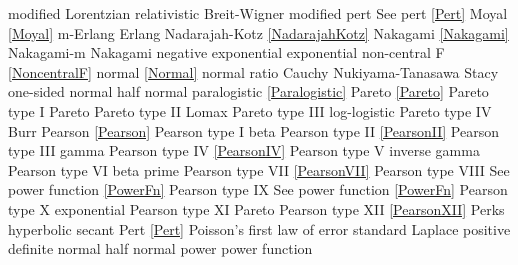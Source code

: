 modified Lorentzian				\dotfill	relativistic Breit-Wigner					%
modified pert					\dotfill	See pert \eqref{Pert}					\ncite	%
Moyal						\dotfill	\eqref{Moyal}						\ncite	
m-Erlang						\dotfill	Erlang 							\ncite	%
%
Nadarajah-Kotz					\dotfill	\eqref{NadarajahKotz}				\mcite{\self}	%
Nakagami 					\dotfill	\eqref{Nakagami} 					\ncite	%
Nakagami-m 					\dotfill	Nakagami 						\ncite   	%
negative exponential				\dotfill	exponential 						\ncite	%
non-central F					\dotfill		\eqref{NoncentralF}				\ncite	%
normal 						\dotfill	\eqref{Normal}						\ncite	%
normal ratio  					\dotfill	Cauchy 							\ncite	%
Nukiyama-Tanasawa 			\dotfill	Stacy 							   	%
%
one-sided normal  				\dotfill	half normal						\ncite	%
paralogistic					\dotfill	\eqref{Paralogistic} 					\ncite	%
Pareto						\dotfill	\eqref{Pareto}						\ncite	%
Pareto type I					\dotfill	Pareto							\ncite	%
Pareto type II					\dotfill	Lomax 							\ncite	%
Pareto type III					\dotfill	log-logistic						\ncite	%
Pareto type IV					\dotfill	Burr								\ncite	%
Pearson			 			\dotfill	\eqref{Pearson}						\ncite	%
Pearson type I					\dotfill	beta 								\ncite	%
Pearson type II					\dotfill	\eqref{PearsonII}					\ncite	%
Pearson type III   				\dotfill	gamma 							\ncite	%
Pearson type IV   				\dotfill	\eqref{PearsonIV} 					\ncite	%
Pearson type V    				\dotfill	inverse gamma						\ncite	%
Pearson type VI				\dotfill	beta prime 						\ncite	%
Pearson type VII				\dotfill	\eqref{PearsonVII} 					\ncite	%
Pearson type VIII				\dotfill	See power function \eqref{PowerFn}		\ncite	%
Pearson type IX				\dotfill	See power function \eqref{PowerFn}		\ncite	%
Pearson type X    				\dotfill	exponential						\ncite	%
Pearson type XI    				\dotfill	Pareto							   	%
Pearson type XII 				\dotfill	\eqref{PearsonXII}					\ncite	%
Perks						\dotfill	hyperbolic secant 					\ncite	%
Pert							\dotfill	\eqref{Pert} 						\ncite	%
Poisson's first law of error			\dotfill	standard Laplace					\ncite	%
positive definite normal 			\dotfill	half normal 						\ncite 	%
power						\dotfill	power function 						\ncite	%
